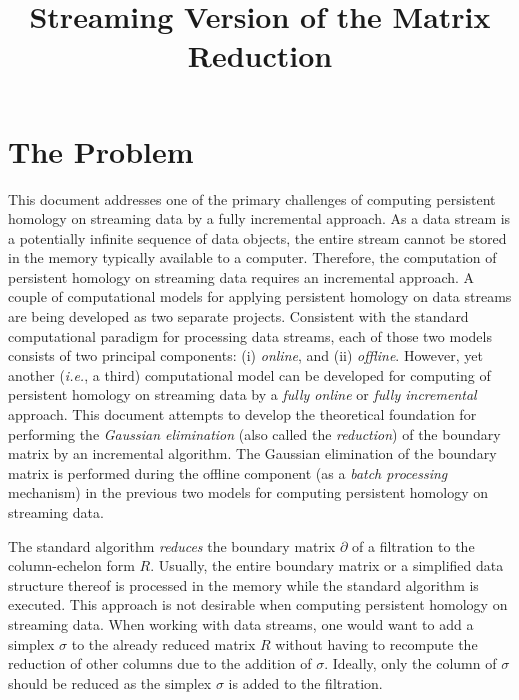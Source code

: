 \documentclass[11pt]{article}
\begin{document}
\title{Streaming Version of the Matrix Reduction}

\maketitle

\section{The Problem}

This document addresses one of the primary challenges of computing persistent homology on streaming 
data by a fully incremental approach.  As a data stream is a potentially infinite sequence of data 
objects, the entire stream cannot be stored in the memory typically available to a computer.  
Therefore, the computation of persistent homology on streaming data requires an incremental 
approach.  A couple of computational models for applying persistent homology on data streams are 
being developed as two separate projects.  Consistent with the standard computational paradigm 
\cite{silva-13} for processing data streams, each of those two models consists of two principal 
components: (i) \emph{online}, and (ii) \emph{offline}.  However, yet another (\emph{i.e.}, a 
third) computational model can be developed for computing of persistent homology on streaming data 
by a \emph{fully online} or \emph{fully incremental} approach.  This document attempts to develop 
the theoretical foundation for performing the \emph{Gaussian elimination} (also called the 
\emph{reduction}) of the boundary matrix \cite{edelsbrunner-00, zomorodian-05} by an incremental 
algorithm.  The Gaussian elimination of the boundary matrix is performed during the offline 
component (as a \emph{batch processing} mechanism) in the previous two models for computing 
persistent homology on streaming data.


The standard algorithm \cite{edelsbrunner-00, zomorodian-05} \emph{reduces} the boundary matrix 
$\partial$ of a filtration \cite{zomorodian-10} to the column-echelon form $R$.  Usually, the 
entire boundary matrix or a simplified data structure thereof is processed in the memory while the 
standard algorithm is executed.  This approach is not desirable when computing persistent homology 
on streaming data.  When working with data streams, one would want to add a simplex $\sigma$ to the 
already reduced matrix $R$ without having to recompute the reduction of other columns due to the 
addition of $\sigma$.  Ideally, only the column of $\sigma$ should be reduced as the simplex 
$\sigma$ is added to the filtration.





\end{document}
